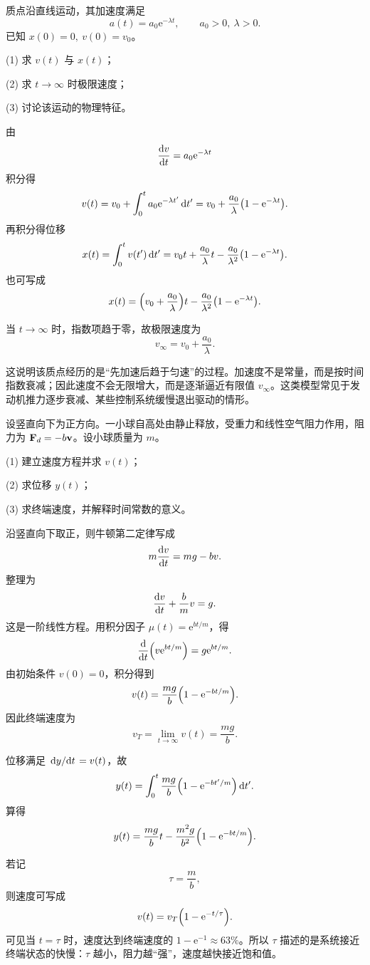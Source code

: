 \begin{competition}
质点沿直线运动，其加速度满足
\[
a(t)=a_0\mathrm e^{-\lambda t},\qquad a_0>0,\ \lambda>0.
\]
已知 $x(0)=0,\ v(0)=v_0$。

(1) 求 $v(t)$ 与 $x(t)$；

(2) 求 $t\to\infty$ 时极限速度；

(3) 讨论该运动的物理特征。

\begin{solution}
由
\[
\dv{v}{t}=a_0\mathrm e^{-\lambda t}
\]
积分得
\[
v(t)=v_0+\int_0^t a_0\mathrm e^{-\lambda t'}\,\dd t'
=v_0+\frac{a_0}{\lambda}\qty(1-\mathrm e^{-\lambda t}).
\]
再积分得位移
\[
x(t)=\int_0^t v(t')\,\dd t'
=v_0 t+\frac{a_0}{\lambda}t-\frac{a_0}{\lambda^2}\qty(1-\mathrm e^{-\lambda t}).
\]
也可写成
\[
x(t)=\qty(v_0+\frac{a_0}{\lambda})t-\frac{a_0}{\lambda^2}\qty(1-\mathrm e^{-\lambda t}).
\]

当 $t\to\infty$ 时，指数项趋于零，故极限速度为
\[
v_\infty=v_0+\frac{a_0}{\lambda}.
\]

这说明该质点经历的是“先加速后趋于匀速”的过程。加速度不是常量，而是按时间指数衰减；因此速度不会无限增大，而是逐渐逼近有限值 $v_\infty$。这类模型常见于发动机推力逐步衰减、某些控制系统缓慢退出驱动的情形。
\end{solution}
\end{competition}

\begin{competition}
设竖直向下为正方向。一小球自高处由静止释放，受重力和线性空气阻力作用，阻力为 $\vb F_d=-b\vb v$。设小球质量为 $m$。

(1) 建立速度方程并求 $v(t)$；

(2) 求位移 $y(t)$；

(3) 求终端速度，并解释时间常数的意义。

\begin{solution}
沿竖直向下取正，则牛顿第二定律写成
\[
m\dv{v}{t}=mg-bv.
\]
整理为
\[
\dv{v}{t}+\frac{b}{m}v=g.
\]
这是一阶线性方程。用积分因子 $\mu(t)=\mathrm e^{bt/m}$，得
\[
\dv{}{t}\qty(v\mathrm e^{bt/m})=g\mathrm e^{bt/m}.
\]
由初始条件 $v(0)=0$，积分得到
\[
v(t)=\frac{mg}{b}\qty(1-\mathrm e^{-bt/m}).
\]
因此终端速度为
\[
v_T=\lim_{t\to\infty}v(t)=\frac{mg}{b}.
\]

位移满足 $\dv*{y}{t}=v(t)$，故
\[
y(t)=\int_0^t \frac{mg}{b}\qty(1-\mathrm e^{-bt'/m})\,\dd t'.
\]
算得
\[
y(t)=\frac{mg}{b}t-\frac{m^2g}{b^2}\qty(1-\mathrm e^{-bt/m}).
\]

若记
\[
\tau=\frac{m}{b},
\]
则速度可写成
\[
v(t)=v_T\qty(1-\mathrm e^{-t/\tau}).
\]
可见当 $t=\tau$ 时，速度达到终端速度的 $1-\mathrm e^{-1}\approx 63\%$。所以 $\tau$ 描述的是系统接近终端状态的快慢：$\tau$ 越小，阻力越“强”，速度越快接近饱和值。
\end{solution}
\end{competition}

